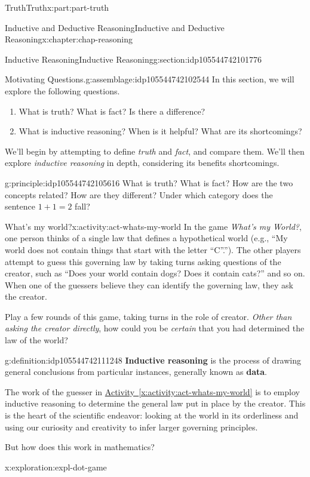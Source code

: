 \documentclass[oneside,10pt,]{book}
\newcommand{\xreffont}{\relax}
\newcommand{\terminology}[1]{\textbf{#1}}
\numberwithin{equation}{section}
\begin{document}
\begin{partptx}{Truth}{}{Truth}{}{}{x:part:part-truth}
\begin{chapterptx}{Inductive and Deductive Reasoning}{}{Inductive and Deductive Reasoning}{}{}{x:chapter:chap-reasoning}
\begin{sectionptx}{Inductive Reasoning}{}{Inductive Reasoning}{}{}{g:section:idp105544742101776}
\begin{assemblage}{Motivating Questions.}{g:assemblage:idp105544742102544}
In this section, we will explore the following questions. %
\begin{enumerate}
\item{}What is truth? What is fact? Is there a difference?%
\item{}What is inductive reasoning? When is it helpful? What are its shortcomings?%
\end{enumerate}
%
\end{assemblage}
We'll begin by attempting to define \emph{truth} and \emph{fact}, and compare them. We'll then explore \emph{inductive reasoning} in depth, considering its benefits shortcomings.%
\begin{principle}{}{}{g:principle:idp105544742105616}%
What is truth? What is fact? How are the two concepts related? How are they different? Under which category does the sentence \(1+1=2\) fall?%
\end{principle}
\begin{activity}{What's my world?}{x:activity:act-whats-my-world}%
In the game \emph{What's my World?}, one person thinks of a single law that defines a hypothetical world (e.g., ``My world does not contain things that start with the letter ``C''.''). The other players attempt to guess this governing law by taking turns asking questions of the creator, such as ``Does your world contain dogs? Does it contain cats?'' and so on. When one of the guessers believe they can identify the governing law, they ask the creator.%
\par
Play a few rounds of this game, taking turns in the role of creator. \emph{Other than asking the creator directly}, how could you be \emph{certain} that you had determined the law of the world?%
\end{activity}%
\begin{definition}{}{g:definition:idp105544742111248}%
%
\terminology{Inductive reasoning} is the process of drawing general conclusions from particular instances, generally known as \terminology{data}.%
\end{definition}
The work of the guesser in \hyperref[x:activity:act-whats-my-world]{Activity~{\xreffont\ref{x:activity:act-whats-my-world}}} is to employ inductive reasoning to determine the general law put in place by the creator. This is the heart of the scientific endeavor: looking at the world in its orderliness and using our curiosity and creativity to infer larger governing principles.%
\par
But how does this work in mathematics?%
\begin{exploration}{}{x:exploration:expl-dot-game}%

\end{exploration}
\end{sectionptx}
\end{chapterptx}
\end{partptx}
\end{document}
